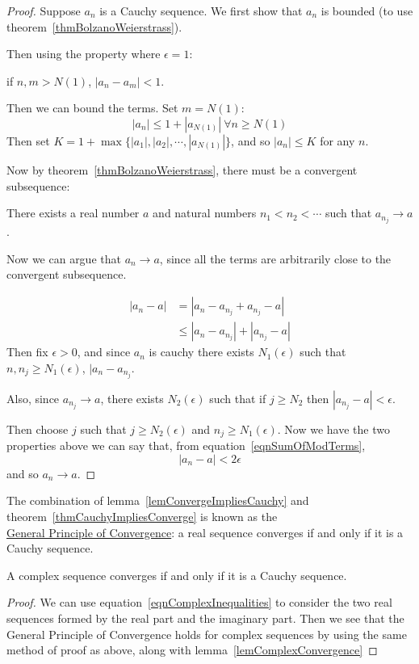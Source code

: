 \documentclass[../Main.tex]{subfiles}
\begin{document}
\begin{proof}
    Suppose $a_n$ is a Cauchy sequence. We first show that $a_n$ is bounded (to use theorem~\ref{thmBolzanoWeierstrass}).\par
    Then using the property where $\epsilon = 1$:\par
    if $n, m > N(1)$, $|a_n - a_m| < 1$.\par
    Then we can bound the terms. Set $m = N(1)$:
    \begin{equation*}
        |a_n| \leq 1 + |a_{N(1)}|~\forall n \geq N(1)
    \end{equation*}
    Then set $K = 1 + \max{\{|a_1|, |a_2|, \cdots, |a_{N(1)}|\}}$, and so $|a_n| \leq K$ for any $n$.\par
    Now by theorem~\ref{thmBolzanoWeierstrass}, there must be a convergent subsequence:\par
    There exists a real number $a$ and natural numbers $n_1 < n_2 < \cdots$ such that $a_{n_j} \to a$.\par
    Now we can argue that $a_n \to a$, since all the terms are arbitrarily close to the convergent subsequence.\par
    \begin{align}
        |a_n - a| &= |a_n - a_{n_j} + a_{n_j} - a| \nonumber \\
        &\leq |a_n - a_{n_j}| + |a_{n_j} - a| \label{eqnSumOfModTerms}
    \end{align}
    Then fix $\epsilon > 0$, and since $a_n$ is cauchy there exists $N_1(\epsilon)$ such that $n, n_j \geq N_1(\epsilon)$, $|a_n - a_{n_j}$.\par
    Also, since $a_{n_j} \to a$, there exists $N_2(\epsilon)$ such that if $j \geq N_2$ then $|a_{n_j} - a| < \epsilon$.\par
    Then choose $j$ such that $j \geq N_2(\epsilon)$ and $n_j \geq N_1(\epsilon)$. Now we have the two properties above we can say that, from equation~\ref{eqnSumOfModTerms},
    \begin{equation*}
        |a_n - a| < 2 \epsilon
    \end{equation*}
    and so $a_n \to a$.
\end{proof}
The combination of lemma~\ref{lemConvergeImpliesCauchy} and theorem~\ref{thmCauchyImpliesConverge} is known as the \\ \underline{General Principle of Convergence}: a real sequence converges if and only if it is a Cauchy sequence.
\begin{corollary}
    A complex sequence converges if and only if it is a Cauchy sequence.
    \label{corComplexCauchyConvergence}
\end{corollary}
\begin{proof}
    We can use equation~\ref{eqnComplexInequalities} to consider the two real sequences formed by the real part and the imaginary part. Then we see that the General Principle of Convergence holds for complex sequences by using the same method of proof as above, along with lemma~\ref{lemComplexConvergence}
\end{proof}
\end{document}
